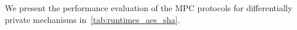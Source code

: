 

We present the performance evaluation of the MPC protocols for differentially private mechanisms in~\autoref{tab:runtimes_aes_sha}.

